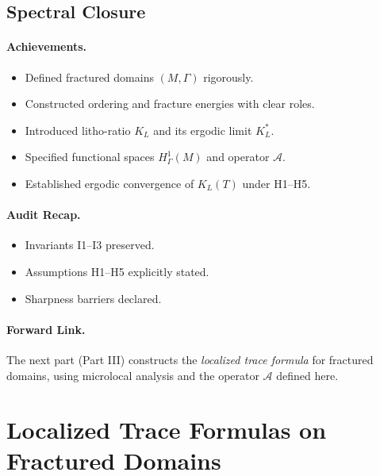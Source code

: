 \bigskip


\subsection*{Spectral Closure}

\paragraph{Achievements.}
\begin{itemize}
\item Defined fractured domains $(M,\Gamma)$ rigorously.
\item Constructed ordering and fracture energies with clear roles.
\item Introduced litho-ratio $K_L$ and its ergodic limit $K_L^*$.
\item Specified functional spaces $H^1_\Gamma(M)$ and operator $\mathcal{A}$.
\item Established ergodic convergence of $K_L(T)$ under H1–H5.
\end{itemize}

\paragraph{Audit Recap.}
\begin{itemize}
\item[\checkmark] Invariants I1–I3 preserved.
\item[\checkmark] Assumptions H1–H5 explicitly stated.
\item[\checkmark] Sharpness barriers declared.
\end{itemize}

\paragraph{Forward Link.}
The next part (Part III) constructs the \emph{localized trace formula}
for fractured domains, using microlocal analysis and the operator
$\mathcal{A}$ defined here.


\section{Localized Trace Formulas on Fractured Domains}
\label{sec:trace-formulas}

